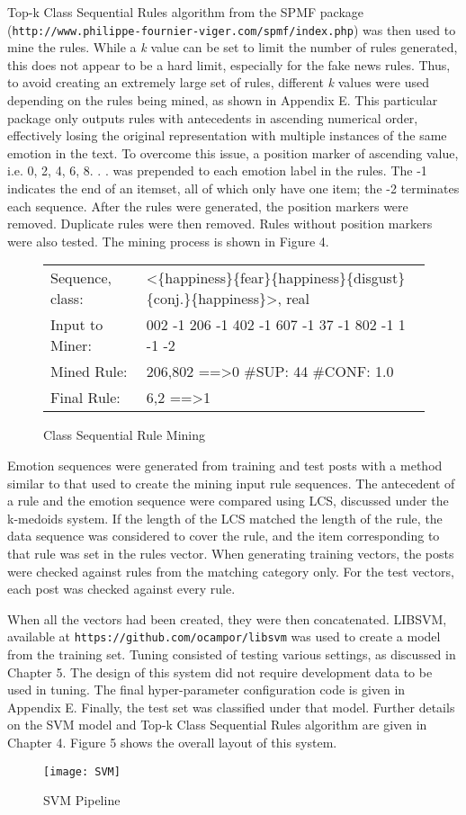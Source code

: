 \documentclass [11pt, proquest] {uwthesis}[2020/02/24]
\begin{document}
Top-k Class Sequential Rules algorithm from the SPMF package\\ (\texttt{http://www.philippe-fournier-viger.com/spmf/index.php}) was then used to mine the rules. While a \textit{k} value can be set to limit the number of rules generated, this does not appear to be a hard limit, especially for the fake news rules. Thus, to avoid creating an extremely large set of rules, different \textit{k} values were used depending on the rules being mined, as shown in Appendix E. This particular package only outputs rules with antecedents in ascending numerical order, effectively losing the original representation with multiple instances of the same emotion in the text. To overcome this issue, a position marker of ascending value, i.e. 0, 2, 4, 6, 8. . . was prepended to each emotion label in the rules. The -1 indicates the end of an itemset, all of which only have one item; the -2 terminates each sequence. After the rules were generated, the position markers were removed. Duplicate rules were then removed. Rules without position markers were also tested. The mining process is shown in Figure 4.
\begin{figure}[hbt!]
\centering
\begin{tabular}{ p{3cm}p{13cm}}
 \hline
 Sequence, class:& \textless\{happiness\}\{fear\}\{happiness\}\{disgust\}\{conj.\}\{happiness\}\textgreater, real\\
 Input to Miner:& 002 -1 206 -1 402 -1 607 -1  37 -1 802 -1 1 -1 -2\\
 Mined Rule:&206,802 ==\textgreater 0 \#SUP: 44 \#CONF: 1.0\\
 Final Rule:&6,2 ==\textgreater 1\\
 \hline
\end{tabular}
\caption{Class Sequential Rule Mining}
\end{figure}
\newpage
Emotion sequences were generated from training and test posts with a method similar to that used to create the mining input rule sequences. The antecedent of a rule and the emotion sequence were compared using LCS, discussed under the k-medoids system. If the length of the LCS matched the length of the rule, the data sequence was considered to cover the rule, and the item corresponding to that rule was set in the rules vector. When generating training vectors, the posts were checked against rules from the matching category only. For the test vectors, each post was checked against every rule. 

When all the vectors had been created, they were then concatenated.  LIBSVM, available at \texttt{https://github.com/ocampor/libsvm} \citep{Chang2011} was used to create a model from the training set. Tuning consisted of testing various settings, as discussed in Chapter 5. The design of this system did not require development data to be used in tuning. The final hyper-parameter configuration code is given in Appendix E. Finally, the test set was classified under that model. Further details on the SVM model and Top-k Class Sequential Rules algorithm are given in Chapter 4. Figure 5 shows the overall layout of this system.
\begin{figure}[hbt!]
\texttt{[image: SVM]}
\caption{SVM Pipeline}
\end{figure}
\newpage
\end{document}
